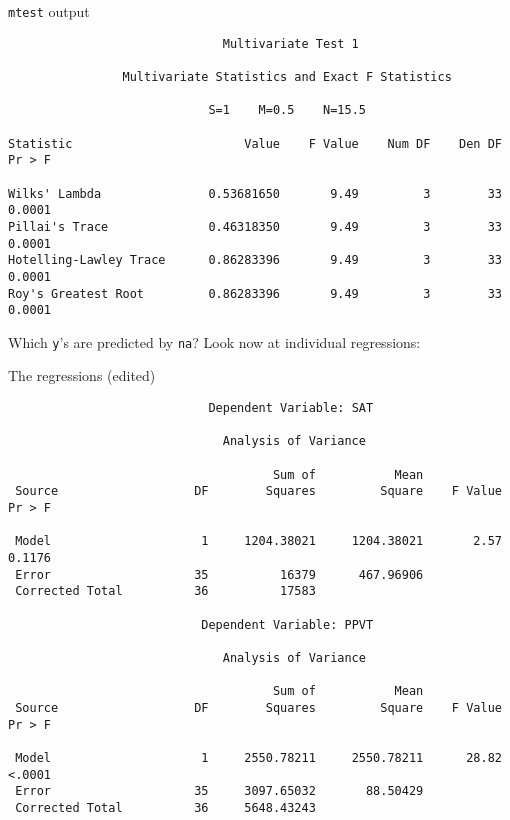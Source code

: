 \begin{frame}[fragile]{\texttt{mtest} output}

{\scriptsize
\begin{verbatim}
                              Multivariate Test 1

                Multivariate Statistics and Exact F Statistics
 
                            S=1    M=0.5    N=15.5
 
Statistic                        Value    F Value    Num DF    Den DF    Pr > F

Wilks' Lambda               0.53681650       9.49         3        33    0.0001
Pillai's Trace              0.46318350       9.49         3        33    0.0001
Hotelling-Lawley Trace      0.86283396       9.49         3        33    0.0001
Roy's Greatest Root         0.86283396       9.49         3        33    0.0001
\end{verbatim}
}

Which \texttt{y}'s are predicted by \texttt{na}? Look now at
individual regressions:
  
\end{frame}

\begin{frame}[fragile]{The regressions (edited)}

{\scriptsize
\begin{verbatim}
                            Dependent Variable: SAT 

                              Analysis of Variance
 
                                     Sum of           Mean
 Source                   DF        Squares         Square    F Value    Pr > F

 Model                     1     1204.38021     1204.38021       2.57    0.1176
 Error                    35          16379      467.96906                     
 Corrected Total          36          17583                                    

                           Dependent Variable: PPVT 

                              Analysis of Variance
 
                                     Sum of           Mean
 Source                   DF        Squares         Square    F Value    Pr > F

 Model                     1     2550.78211     2550.78211      28.82    <.0001
 Error                    35     3097.65032       88.50429                     
 Corrected Total          36     5648.43243                                    
\end{verbatim}
}

\end{frame}

